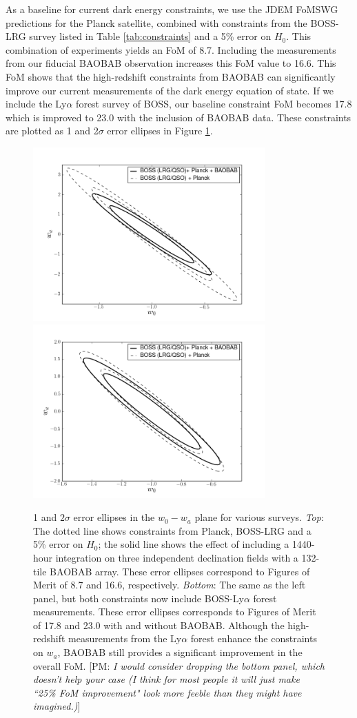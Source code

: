\documentclass[10pt,iop]{emulateapj}
\def\pvm#1{[PM: {\it #1}] }
\begin{document}
As a baseline for current dark energy constraints,
we use the JDEM FoMSWG predictions for the Planck satellite, combined with constraints from the 
BOSS-LRG survey listed in Table \ref{tab:constraints} and a 5\% error on $H_0$.  
This combination of experiments yields an FoM
of 8.7.  Including the measurements from our fiducial BAOBAB observation increases this
FoM value to 16.6.  This FoM
shows that the high-redshift constraints from BAOBAB can significantly improve our current
measurements of the dark energy equation of state.  If we include the Ly$\alpha$ forest
survey of BOSS, our baseline constraint FoM becomes 17.8 which is improved to 23.0 with the inclusion
of BAOBAB data.  These constraints are plotted as 1 and 2$\sigma$ error ellipses in Figure
\ref{fig:fish}.  
\begin{figure}\centering
\includegraphics[width=3.5in]{fishmat_nolya.png}
\includegraphics[width=3.5in]{fishmat_lya.png}
\caption{1 and $2\sigma$ error ellipses in the $w_0-w_a$ plane for various 
surveys.  \emph{Top}: The dotted line shows constraints from Planck, BOSS-LRG 
and a 5\% error on $H_0$; the solid line shows the effect of including a 
1440-hour integration on three independent declination fields with a 132-tile 
BAOBAB array.  These error ellipses correspond to Figures of Merit of 8.7 and 
16.6, respectively.  \emph{Bottom}: The same as the left panel, but both 
constraints now include BOSS-Ly$\alpha$ forest measurements.  These error 
ellipses corresponds to Figures of Merit of 17.8 and 23.0 with and without 
BAOBAB.  Although the high-redshift measurements from the Ly$\alpha$ forest 
enhance the constraints on $w_a$, BAOBAB still provides a significant 
improvement in the overall FoM. \pvm{I would consider dropping the bottom
panel, which doesn't help your case (I think for most people it will just make
``25\% FoM improvement" look more feeble than they might have imagined.)}}
\label{fig:fish}
\end{figure}
\end{document}
